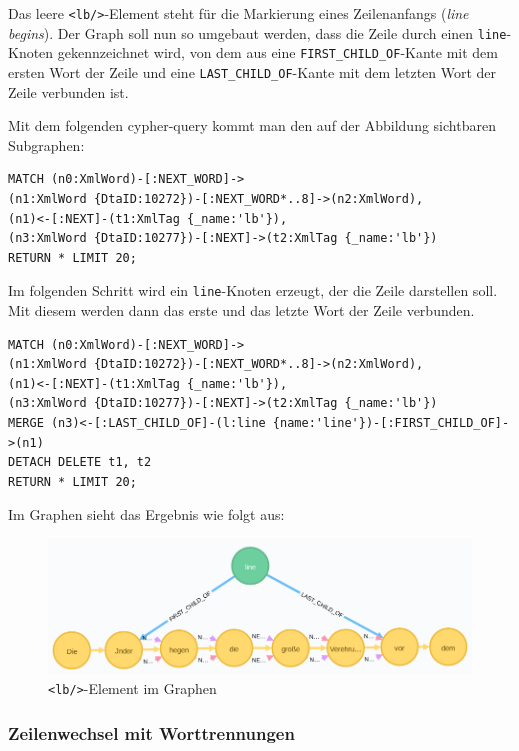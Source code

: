 \documentclass[12pt,ngerman,]{article}
\begin{document}
Das leere \texttt{\textless{}lb/\textgreater{}}-Element steht für die
Markierung eines Zeilenanfangs (\emph{line begins}). Der Graph soll nun
so umgebaut werden, dass die Zeile durch einen \texttt{line}-Knoten
gekennzeichnet wird, von dem aus eine \texttt{FIRST\_CHILD\_OF}-Kante
mit dem ersten Wort der Zeile und eine \texttt{LAST\_CHILD\_OF}-Kante
mit dem letzten Wort der Zeile verbunden ist.

Mit dem folgenden cypher-query kommt man den auf der Abbildung
sichtbaren Subgraphen:

\begin{verbatim}
MATCH (n0:XmlWord)-[:NEXT_WORD]->
(n1:XmlWord {DtaID:10272})-[:NEXT_WORD*..8]->(n2:XmlWord),
(n1)<-[:NEXT]-(t1:XmlTag {_name:'lb'}),
(n3:XmlWord {DtaID:10277})-[:NEXT]->(t2:XmlTag {_name:'lb'})
RETURN * LIMIT 20;
\end{verbatim}

Im folgenden Schritt wird ein \texttt{line}-Knoten erzeugt, der die
Zeile darstellen soll. Mit diesem werden dann das erste und das letzte
Wort der Zeile verbunden.

\begin{verbatim}
MATCH (n0:XmlWord)-[:NEXT_WORD]->
(n1:XmlWord {DtaID:10272})-[:NEXT_WORD*..8]->(n2:XmlWord),
(n1)<-[:NEXT]-(t1:XmlTag {_name:'lb'}),
(n3:XmlWord {DtaID:10277})-[:NEXT]->(t2:XmlTag {_name:'lb'})
MERGE (n3)<-[:LAST_CHILD_OF]-(l:line {name:'line'})-[:FIRST_CHILD_OF]->(n1)
DETACH DELETE t1, t2
RETURN * LIMIT 20;
\end{verbatim}

Im Graphen sieht das Ergebnis wie folgt aus:

\begin{figure}
\centering
\includegraphics{Bilder/TEI2Graph/lb-to-line.png}
\caption{\texttt{\textless{}lb/\textgreater{}}-Element im Graphen}
\end{figure}

\subsubsection{Zeilenwechsel mit
Worttrennungen}\label{zeilenwechsel-mit-worttrennungen}
\end{document}
